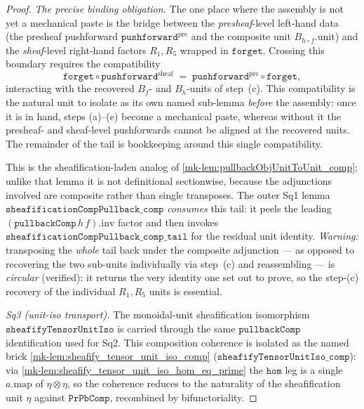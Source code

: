 \begin{proof}
  \emph{The precise binding obligation.} The one place where the assembly is not yet a
  mechanical paste is the bridge between the \emph{presheaf}-level left-hand data (the
  presheaf pushforward \(\mathtt{pushforward}^{\mathrm{pre}}\) and the composite unit
  \(B_{h\circ f}.\mathrm{unit}\)) and the \emph{sheaf}-level right-hand factors \(R_1, R_5\)
  wrapped in \(\mathtt{forget}\). Crossing this boundary requires the compatibility
  \[
    \mathtt{forget} \circ \mathtt{pushforward}^{\mathrm{sheaf}}
      \;=\;
    \mathtt{pushforward}^{\mathrm{pre}} \circ \mathtt{forget},
  \]
  interacting with the recovered \(B_f\)- and \(B_h\)-units of step~(c). This compatibility is
  the natural unit to isolate as its own named sub-lemma \emph{before} the assembly: once it
  is in hand, steps (a)--(e) become a mechanical paste, whereas without it the presheaf- and
  sheaf-level pushforwards cannot be aligned at the recovered units. The remainder of the tail
  is bookkeeping around this single compatibility.

  This is the sheafification-laden analog of \ref{mk-lem:pullbackObjUnitToUnit_comp}; unlike
  that lemma it is not definitional sectionwise, because the adjunctions involved are
  composite rather than single transposes. The outer Sq1 lemma
  \(\mathtt{sheafificationCompPullback\_comp}\) \emph{consumes} this tail: it peels the leading
  \((\mathtt{pullbackComp}\,h\,f).\mathrm{inv}\) factor and then invokes
  \(\mathtt{sheafificationCompPullback\_comp\_tail}\) for the residual unit identity.
  \emph{Warning:} transposing the \emph{whole} tail back under the composite adjunction --- as
  opposed to recovering the two sub-units individually via step~(c) and reassembling --- is
  \emph{circular} (verified): it returns the very identity one set out to prove, so the
  step-(c) recovery of the individual \(R_1, R_5\) units is essential.

  \emph{Sq3 (unit-iso transport).} The monoidal-unit sheafification isomorphism
  \(\mathtt{sheafifyTensorUnitIso}\) is carried through the same \(\mathtt{pullbackComp}\)
  identification used for Sq2. This composition coherence is isolated as the named brick
  \ref{mk-lem:sheafify_tensor_unit_iso_comp} (\(\mathtt{sheafifyTensorUnitIso\_comp}\)): via
  \ref{mk-lem:sheafify_tensor_unit_iso_hom_eq_prime} the \(\mathtt{hom}\) leg is a single
  \(a.\mathrm{map}\) of \(\eta\otimes\eta\), so the coherence reduces to the naturality of the
  sheafification unit \(\eta\) against \(\mathtt{PrPbComp}\), recombined by bifunctoriality.


\end{proof}
